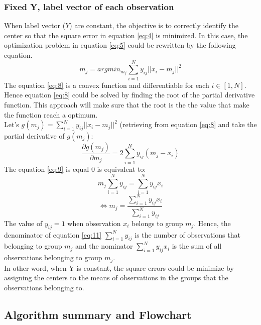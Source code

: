 \documentclass[conference]{IEEEtran}
\begin{document}
\subsubsection{Fixed Y, label vector of each observation} \label{FixedY}
\indent When label vector ($Y$) are constant, the objective is to correctly identify the center so that the square error in equation \ref{eq:4} is minimized. In this case, the optimization problem in equation \ref{eq:5} could be rewritten by the following equation.
\begin{equation} \label{eq:8}
m_j=argmin_{m_j}\sum_{i=1}^{N}y_{ij}||x_i-m_j||^2
\end{equation}
\indent The equation \ref{eq:8} is a convex function and differentiable for each $i\in[1,N]$. Hence equation \ref{eq:8} could be solved by finding the root of the partial derivative function. This approach will make sure that the root is the the value that make the function reach a optimum.\\
\indent Let's $g(m_j)=\sum_{i=1}^{N}y_{ij}||x_i-m_j||^2$ (retrieving from equation \ref{eq:8} and take the partial derivative of $g(m_j)$:\\
\begin{equation} \label{eq:9}
\frac{\partial g(m_j)}{\partial m_j}=2 \sum_{i=1}^{N}y_{ij}(m_j-x_i)
\end{equation}
\indent The equation \ref{eq:9} is equal 0 is equivalent to:
\begin{equation} \label{eq:10}
m_j\sum_{i=1}^{N}y_{ij}=\sum_{i=1}^{N}y_{ij}x_{i} 
\end{equation}
\begin{equation} \label{eq:11}
\Leftrightarrow m_j=\frac{\sum_{i=1}^{N}y_{ij}x_{i}}{\sum_{i=1}^{N}y_{ij}}
\end{equation}
\indent The value of $y_{ij}=1$ when observation $x_i$ belongs to group $m_j$. Hence, the denominator of equation \ref{eq:11} $\sum_{i=1}^{N}y_{ij}$ is the number of observations that belonging to group $m_j$ and the nominator $\sum_{i=1}^{N}y_{ij}x_{i}$ is the sum of all observations belonging to group $m_j$.\\
\indent In other word, when Y is constant, the square errors could be minimize by assigning the centers to the means of observations in the groups that the observations belonging to.
\subsection{Algorithm summary and Flowchart}
\end{document}
